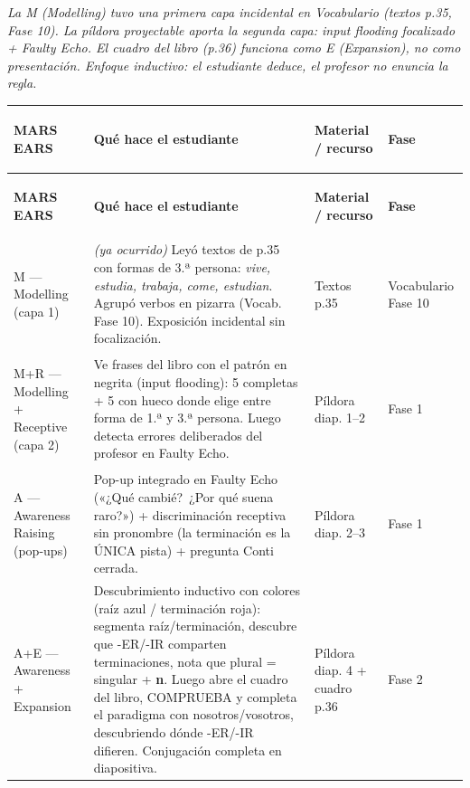 \documentclass[a4paper,10pt]{article}
\renewcommand{\arraystretch}{1.3}
\begin{document}
\vspace{0.2cm}

{\small\textit{La M (Modelling) tuvo una primera capa incidental en Vocabulario (textos p.35, Fase 10). La píldora proyectable aporta la segunda capa: input flooding focalizado + Faulty Echo. El cuadro del libro (p.36) funciona como E (Expansion), no como presentación. Enfoque inductivo: el estudiante deduce, el profesor no enuncia la regla.}}

\vspace{0.3cm}

{\footnotesize
\renewcommand{\arraystretch}{1.35}
\begin{longtable}{|>{\bfseries\raggedright\arraybackslash}p{2.4cm}|p{4.5cm}|p{3.2cm}|p{2.8cm}|}
\hline
\rowcolor{azulprincipal!15}
\textbf{MARS EARS} & \textbf{Qué hace el estudiante} & \textbf{Material / recurso} & \textbf{Fase} \\
\hline
\endfirsthead
\hline
\rowcolor{azulprincipal!15}
\textbf{MARS EARS} & \textbf{Qué hace el estudiante} & \textbf{Material / recurso} & \textbf{Fase} \\
\hline
\endhead

M — Modelling (capa 1) & \textit{(ya ocurrido)} Leyó textos de p.35 con formas de 3.ª persona: \textit{vive, estudia, trabaja, come, estudian}. Agrupó verbos en pizarra (Vocab. Fase 10). Exposición incidental sin focalización. & Textos p.35 & Vocabulario Fase 10 \\
\hline

M+R — Modelling + Receptive (capa 2) & Ve frases del libro con el patrón en negrita (input flooding): 5 completas + 5 con hueco donde elige entre forma de 1.ª y 3.ª persona. Luego detecta errores deliberados del profesor en Faulty Echo. & Píldora diap. 1--2 & Fase 1 \\
\hline

A — Awareness Raising (pop-ups) & Pop-up integrado en Faulty Echo («¿Qué cambié?\ ¿Por qué suena raro?») + discriminación receptiva sin pronombre (la terminación es la ÚNICA pista) + pregunta Conti cerrada. & Píldora diap. 2--3 & Fase 1 \\
\hline

A+E — Awareness + Expansion & Descubrimiento inductivo con colores (raíz azul / terminación roja): segmenta raíz/terminación, descubre que -ER/-IR comparten terminaciones, nota que plural = singular + \textbf{n}. Luego abre el cuadro del libro, COMPRUEBA y completa el paradigma con nosotros/vosotros, descubriendo dónde -ER/-IR difieren. Conjugación completa en diapositiva. & Píldora diap. 4 + cuadro p.36 & Fase 2 \\
\hline


\end{longtable}}
\end{document}
